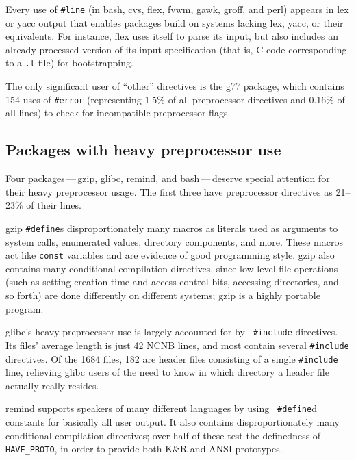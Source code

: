 \documentclass[11pt]{article}
\newcommand{\pkg}[1]{\textsf{#1}}
\begin{document}
Every use of {\tt \#line} (in \pkg{bash}, cvs, \pkg{flex}, \pkg{fvwm},
\pkg{gawk}, \pkg{groff}, and \pkg{perl}) appears in lex or yacc output
that enables packages build on systems lacking lex, yacc, or their
equivalents.  For instance, \pkg{flex} uses itself to parse its input,
but also includes an already-processed version of its input
specification (that is, C code corresponding to a {\tt .l} file) for
bootstrapping.

The only significant user of ``other'' directives is the \pkg{g77} package, which
contains 154 uses of {\tt \#error} (representing 1.5\% of all preprocessor
directives and 0.16\% of all lines) to check for incompatible preprocessor
flags.


\subsection{Packages with heavy preprocessor use}

Four packages\,---\,\pkg{gzip}, \pkg{glibc}, \pkg{remind}, and \pkg{bash}\,---\,deserve special
attention for their heavy preprocessor usage.  The first three have
preprocessor directives as 21--23\% of their lines.

\pkg{gzip} {\tt \#define}s disproportionately many macros as literals used as
arguments to system calls, enumerated values, directory components, and
more.  These macros act like {\tt const} variables and are evidence of good
programming style.  \pkg{gzip} also contains many conditional compilation
directives, since low-level file operations (such as setting creation time
and access control bits, accessing directories, and so forth) are done
differently on different systems; \pkg{gzip} is a highly portable program.

\pkg{glibc}'s heavy preprocessor use is largely accounted for by {\tt
  \#include} directives.  Its files' average length is just 42 NCNB
lines, and most contain several {\tt \#include} directives.  Of the
1684 files, 182 are header files consisting of a single {\tt \#include}
line, relieving \pkg{glibc} users of the need to know in which directory
a header file actually really resides.

\pkg{remind} supports speakers of many different languages by using {\tt
\#define}d constants for basically all user output.  It also contains
disproportionately many conditional compilation directives; over half of
these test the definedness of \verb|HAVE_PROTO|, in order to provide both
K\&R and ANSI prototypes.
\end{document}
